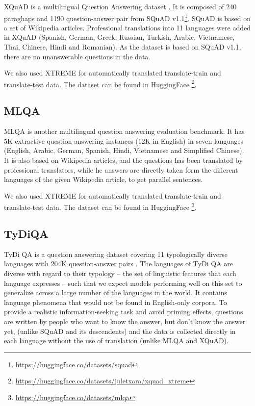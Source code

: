\documentclass[11pt]{article}
\begin{document}
XQuAD is a multilingual Question Answering dataset \cite{Artetxe:etal:2019}. It is composed of 240 paraghaps and 1190 question-answer pair from SQuAD v1.1\footnote{\url{https://huggingface.co/datasets/squad}}. SQuAD is based on a set of Wikipedia articles. Professional translations into 11 languages were added in XQuAD (Spanish, German, Greek, Russian, Turkish, Arabic, Vietnamese, Thai, Chinese, Hindi and Romanian). As the dataset is based on SQuAD v1.1, there are no unanswerable questions in the data. 

We also used XTREME \cite{XTREME} for automatically translated translate-train and translate-test data. The dataset can be found in HuggingFace \footnote{\url{https://huggingface.co/datasets/juletxara/xquad_xtreme}}.

\subsection{MLQA}

MLQA \cite{lewis2019mlqa} is another multilingual question answering evaluation benchmark. It has 5K extractive question-answering instances (12K in English) in seven languages (English, Arabic, German, Spanish, Hindi, Vietnamese and Simplified Chinese). It is also based on Wikipedia articles, and the questions has been translated by professional translators, while he answers are directly taken form the different languages of the given Wikipedia article, to get parallel sentences.

We also used XTREME \cite{XTREME} for automatically translated translate-train and translate-test data. The dataset can be found in HuggingFace \footnote{\url{https://huggingface.co/datasets/mlqa}}.

\subsection{TyDiQA}

TyDi QA is a question answering dataset covering 11 typologically diverse languages with 204K question-answer pairs \cite{tydiqa}. The languages of TyDi QA are diverse with regard to their typology -- the set of linguistic features that each language expresses -- such that we expect models performing well on this set to generalize across a large number of the languages in the world. It contains language phenomena that would not be found in English-only corpora. To provide a realistic information-seeking task and avoid priming effects, questions are written by people who want to know the answer, but don’t know the answer yet, (unlike SQuAD and its descendents) and the data is collected directly in each language without the use of translation (unlike MLQA and XQuAD).
\end{document}
